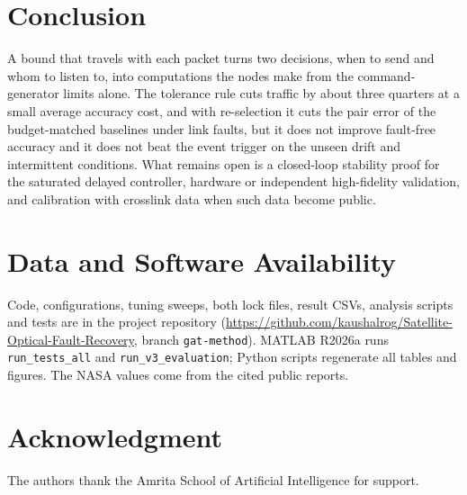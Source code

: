 \documentclass[journal]{IEEEtran}
\begin{document}
\section{Conclusion}
A bound that travels with each packet turns two decisions, when to send and whom to listen to, into computations the nodes make from the command-generator limits alone. The tolerance rule cuts traffic by about three quarters at a small average accuracy cost, and with re-selection it cuts the pair error of the budget-matched baselines under link faults, but it does not improve fault-free accuracy and it does not beat the event trigger on the unseen drift and intermittent conditions. What remains open is a closed-loop stability proof for the saturated delayed controller, hardware or independent high-fidelity validation, and calibration with crosslink data when such data become public.

\section*{Data and Software Availability}
Code, configurations, tuning sweeps, both lock files, result CSVs, analysis scripts and tests are in the project repository (\url{https://github.com/kaushalrog/Satellite-Optical-Fault-Recovery}, branch \texttt{gat-method}). MATLAB R2026a runs \texttt{run\_tests\_all} and \texttt{run\_v3\_evaluation}; Python scripts regenerate all tables and figures. The NASA values come from the cited public reports.

\section*{Acknowledgment}
The authors thank the Amrita School of Artificial Intelligence for support.


\end{document}
